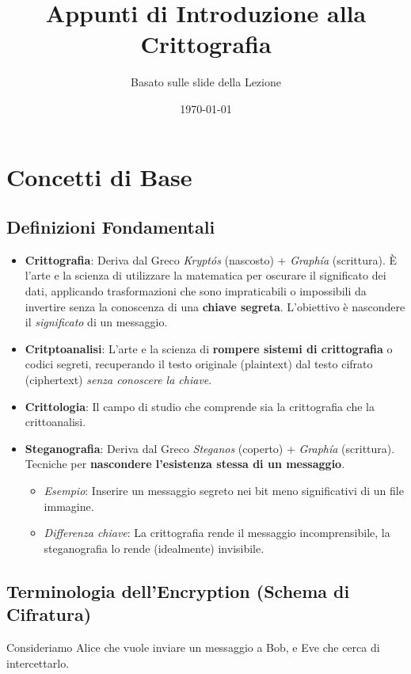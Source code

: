 \documentclass{article}
\title{\textbf{Appunti di Introduzione alla Crittografia}}
\author{Basato sulle slide della Lezione}
\date{\today}
\begin{document}
\maketitle
\tableofcontents
\newpage

\section{Concetti di Base}

\subsection{Definizioni Fondamentali}
\begin{itemize}
    \item \textbf{Crittografia}: Deriva dal Greco \textit{Kryptós} (nascosto) + \textit{Graphía} (scrittura). È l'arte e la scienza di utilizzare la matematica per oscurare il significato dei dati, applicando trasformazioni che sono impraticabili o impossibili da invertire senza la conoscenza di una \textbf{chiave segreta}. L'obiettivo è nascondere il \textit{significato} di un messaggio.

    \item \textbf{Critptoanalisi}: L'arte e la scienza di \textbf{rompere sistemi di crittografia} o codici segreti, recuperando il testo originale (plaintext) dal testo cifrato (ciphertext) \textit{senza conoscere la chiave}.

    \item \textbf{Crittologia}: Il campo di studio che comprende sia la crittografia che la crittoanalisi.

    \item \textbf{Steganografia}: Deriva dal Greco \textit{Steganos} (coperto) + \textit{Graphía} (scrittura). Tecniche per \textbf{nascondere l'esistenza stessa di un messaggio}.
    \begin{itemize}
        \item \textit{Esempio}: Inserire un messaggio segreto nei bit meno significativi di un file immagine.
        \item \textit{Differenza chiave}: La crittografia rende il messaggio incomprensibile, la steganografia lo rende (idealmente) invisibile.
    \end{itemize}
\end{itemize}

\subsection{Terminologia dell'Encryption (Schema di Cifratura)}
Consideriamo Alice che vuole inviare un messaggio a Bob, e Eve che cerca di intercettarlo.
\end{document}
